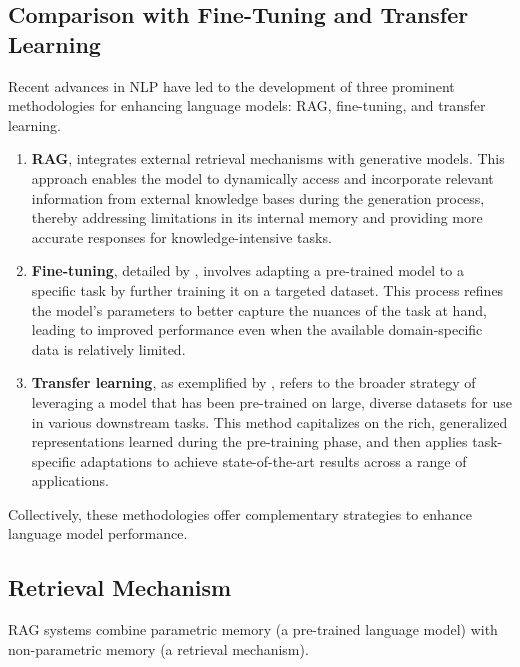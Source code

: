 \subsection{Comparison with Fine-Tuning and Transfer Learning}
Recent advances in NLP have led to the development of three prominent methodologies for enhancing language models: RAG, fine-tuning, and transfer learning.
 \begin{enumerate}
  	\item \textbf{RAG}, integrates external retrieval mechanisms with generative models. This approach enables the model to dynamically access and incorporate relevant information from external knowledge bases during the generation process, thereby addressing limitations in its internal memory and providing more accurate responses for knowledge-intensive tasks.
   \item \textbf{Fine-tuning}, detailed by  \citep{howard2018universal}, involves adapting a pre-trained model to a specific task by further training it on a targeted dataset. This process refines the model’s parameters to better capture the nuances of the task at hand, leading to improved performance even when the available domain-specific data is relatively limited.
   \item \textbf{Transfer learning}, as exemplified by \citep{devlin2018bert}, refers to the broader strategy of leveraging a model that has been pre-trained on large, diverse datasets for use in various downstream tasks. This method capitalizes on the rich, generalized representations learned during the pre-training phase, and then applies task-specific adaptations to achieve state-of-the-art results across a range of applications.
	 
\end{enumerate}
Collectively, these methodologies offer complementary strategies to enhance language model performance.

\subsection{Retrieval Mechanism}
RAG systems combine parametric memory (a pre-trained language model) with non-parametric memory (a retrieval mechanism)\citep{zhao2024retrieval}.

